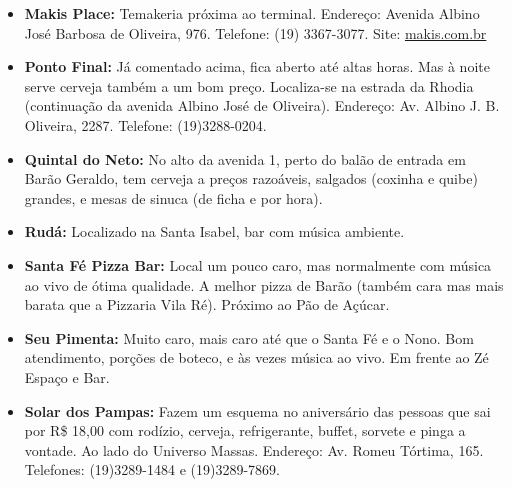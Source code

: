 \begin{itemize}
\item  \textbf{Makis Place:} Temakeria próxima ao terminal. Endereço: Avenida Albino José Barbosa de Oliveira, 976. Telefone: (19) 3367-3077. Site: \url{makis.com.br}
\end{itemize}

\begin{itemize}
\item  \textbf{Ponto Final:} Já comentado acima, fica aberto até altas horas. Mas à noite serve cerveja também a um bom preço. Localiza-se na estrada da Rhodia (continuação da avenida Albino José de Oliveira). Endereço: Av. Albino J. B. Oliveira, 2287. Telefone: (19)3288-0204.
\end{itemize}

\begin{itemize}
\item  \textbf{Quintal do Neto:} No alto da avenida 1, perto do balão de entrada em Barão Geraldo, tem cerveja a preços razoáveis, salgados (coxinha e quibe) grandes, e mesas de sinuca (de ficha e por hora).
\end{itemize}

\begin{itemize}
\item  \textbf{Rudá:} Localizado na Santa Isabel, bar com música ambiente.
\end{itemize}

\begin{itemize}
\item  \textbf{Santa Fé Pizza Bar:} Local um pouco caro, mas normalmente com música ao vivo de ótima qualidade. A melhor pizza de Barão (também cara mas mais barata que a Pizzaria Vila Ré). Próximo ao Pão de Açúcar.
\end{itemize}

\begin{itemize}
\item  \textbf{Seu Pimenta:} Muito caro, mais caro até que o Santa Fé e o Nono. Bom atendimento, porções de boteco, e às vezes música ao vivo. Em frente ao Zé Espaço e Bar.
\end{itemize}

\begin{itemize}
\item  \textbf{Solar dos Pampas:} Fazem um esquema no aniversário das pessoas que sai por R\$ 18,00 com rodízio, cerveja, refrigerante, buffet, sorvete e pinga a vontade. Ao lado do Universo Massas. Endereço: Av. Romeu Tórtima, 165. Telefones: (19)3289-1484 e (19)3289-7869.
\end{itemize}

